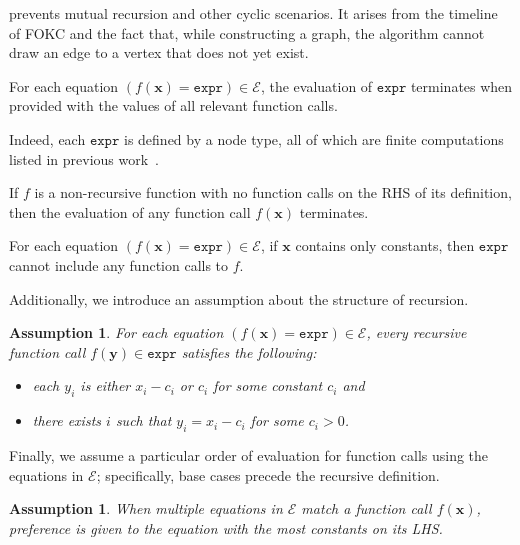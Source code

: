 \documentclass[a4paper,UKenglish,cleveref,autoref]{lipics-v2021}
\newcommand{\expr}{\mathtt{expr}}
\newtheorem{assumption}[theorem]{Assumption}
\begin{document}
 prevents mutual recursion and other cyclic scenarios. It
arises from the timeline of FOKC and the fact that, while constructing a graph,
the algorithm cannot draw an edge to a vertex that does not yet exist.

\begin{observation}\label{assumption3}
  For each equation $(f(\mathbf{x}) = \expr) \in \mathcal{E}$, the evaluation
  of $\expr$ terminates when provided with the values of all relevant function
  calls.
\end{observation}

Indeed, each $\expr$ is defined by a node type, all of which are finite
computations listed in previous
work~\cite{DBLP:conf/kr/DilkasB23,DBLP:conf/nips/Broeck11,DBLP:conf/ijcai/BroeckTMDR11}.

\begin{corollary}\label{fact}
  If $f$ is a non-recursive function with no function calls on the RHS of its
  definition, then the evaluation of any function call $f(\mathbf{x})$
  terminates.
\end{corollary}

\begin{observation}\label{fact2}
  For each equation $(f(\mathbf{x}) = \expr{}) \in \mathcal{E}$, if $\mathbf{x}$
  contains only constants, then $\expr{}$ cannot include any function calls to
  $f$.
\end{observation}

Additionally, we introduce an assumption about the structure of recursion.

\begin{assumption}\label{assumption4}
  For each equation $(f(\mathbf{x}) = \expr) \in \mathcal{E}$, every recursive
  function call $f(\mathbf{y}) \in \expr$ satisfies the following:
  \begin{itemize}
    \item each $y_{i}$ is either $x_{i} - c_{i}$ or $c_{i}$ for some constant
          $c_{i}$ and
    \item there exists $i$ such that $y_{i} = x_{i} - c_{i}$ for some
          $c_{i} > 0$.
  \end{itemize}
\end{assumption}

Finally, we assume a particular order of evaluation for function calls using the
equations in $\mathcal{E}$; specifically, base cases precede the recursive
definition.

\begin{assumption}
  When multiple equations in $\mathcal{E}$ match a function call
  $f(\mathbf{x})$, preference is given to the equation with the most constants
  on its LHS.
\end{assumption}
\end{document}
